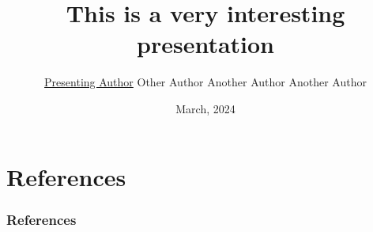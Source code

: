 \documentclass[aspectratio=169,mathserif]{beamer}
\title[]{This is a very interesting presentation}
\author{\underline{Presenting Author} 
\newline Other Author
\newline Another Author
\newline Another Author}
\date{March, 2024}
\begin{document}
\begin{frame}[plain]
    \titlepage
\end{frame}





\section{References}
\begin{frame}
        \frametitle{References}
    \nocite{*}
    
    
\end{frame}
\backmatter
\end{document}
